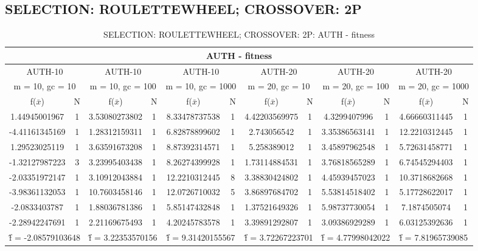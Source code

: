 \subsection{SELECTION: ROULETTEWHEEL; CROSSOVER: 2P}
\begin{table}[H]
	\centering
	\caption{SELECTION: ROULETTEWHEEL; CROSSOVER: 2P: AUTH - fitness}
	\begin{adjustbox}{width=1\textwidth}
		\begin{tabular}{ |c|c||c|c||c|c||c|c||c|c||c|c| }
			\hline
			\multicolumn{12}{|c|}{AUTH - fitness} \\
			\hline
			\multicolumn{2}{|c||}{AUTH-10} & \multicolumn{2}{c||}{AUTH-10} & \multicolumn{2}{c||}{AUTH-10} & \multicolumn{2}{c||}{AUTH-20} & \multicolumn{2}{c||}{AUTH-20} & \multicolumn{2}{c|}{AUTH-20}\\
			\hline
			\multicolumn{2}{|c||}{m = 10, gc = 10} & \multicolumn{2}{c||}{m = 10, gc = 100} & \multicolumn{2}{c||}{m = 10, gc = 1000} & \multicolumn{2}{c||}{m = 20, gc = 10} & \multicolumn{2}{c||}{m = 20, gc = 100} & \multicolumn{2}{c|}{m = 20, gc = 1000}\\
			\hline
			f($\bar{x}$) & N & f($\bar{x}$) & N & f($\bar{x}$) & N & f($\bar{x}$) & N & f($\bar{x}$) & N & f($\bar{x}$) & N\\
			\hline
			\hline
			1.44945001967 & 1 & 3.53080273802 & 1 & 8.33478737538 & 1 & 4.42203569975 & 1 & 4.3299407996 & 1 & 4.66660311445 & 1\\
			-4.41161345169 & 1 & 1.28312159311 & 1 & 6.82878899602 & 1 & 2.743056542 & 1 & 3.35386563141 & 1 & 12.2210312445 & 1\\
			1.29523025119 & 1 & 3.63591673208 & 1 & 8.87392314571 & 1 & 5.258389012 & 1 & 3.45897962548 & 1 & 5.72631458771 & 1\\
			-1.32127987223 & 3 & 3.23995403438 & 1 & 8.26274399928 & 1 & 1.73114884531 & 1 & 3.76818565289 & 1 & 6.74545294403 & 1\\
			-2.03351972147 & 1 & 3.10912043884 & 1 & 12.2210312445 & 8 & 3.38830424802 & 1 & 4.45939457023 & 1 & 10.3718682668 & 1\\
			-3.98361132053 & 1 & 10.7603458146 & 1 & 12.0726710032 & 5 & 3.86897684702 & 1 & 5.53814518402 & 1 & 5.17728622017 & 1\\
			-2.0833403787 & 1 & 1.88036781386 & 1 & 5.85147432848 & 1 & 1.37521649326 & 1 & 5.98737730054 & 1 & 7.1874505074 & 1\\
			-2.28942247691 & 1 & 2.21169675493 & 1 & 4.20245783578 & 1 & 3.39891292807 & 1 & 3.09386929289 & 1 & 6.03125392636 & 1\\
			\hline
			\multicolumn{2}{|c||}{\^{f} = -2.08579103648} & \multicolumn{2}{c||}{\^{f} = 3.22353570156} & \multicolumn{2}{c||}{\^{f} = 9.31420155567} & \multicolumn{2}{c||}{\^{f} = 3.72267223701} & \multicolumn{2}{c||}{\^{f} = 4.77998042022} & \multicolumn{2}{c|}{\^{f} = 7.81965739085}\\
			\hline
		\end{tabular}
	\end{adjustbox}
\end{table}
